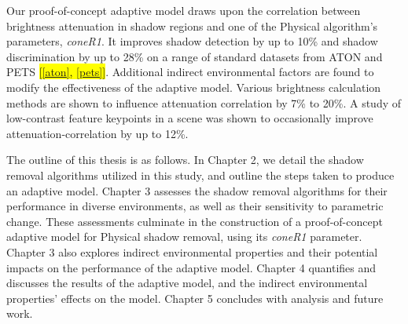 Our proof-of-concept adaptive model draws upon the correlation between brightness attenuation in shadow regions and one of the Physical algorithm's parameters, \textit{coneR1}. It improves shadow detection by up to 10\% and shadow discrimination by up to 28\% on a range of standard datasets from ATON and PETS \hl{[\ref{aton}, \ref{pets}]}. Additional indirect environmental factors are found to modify the effectiveness of the adaptive model. Various brightness calculation methods are shown to influence attenuation correlation by 7\% to 20\%.
A study of low-contrast feature keypoints in a scene was shown to occasionally improve attenuation-correlation by up to 12\%.

The outline of this thesis is as follows. In Chapter 2, we detail the shadow removal algorithms utilized in this study, and outline the steps taken to produce an adaptive model. Chapter 3 assesses the shadow removal algorithms for their performance in diverse environments, as well as their sensitivity to parametric change. These assessments culminate in the construction of a proof-of-concept adaptive model for Physical shadow removal, using its \textit{coneR1} parameter. Chapter 3 also explores indirect environmental properties and their potential impacts on the performance of the adaptive model. Chapter 4 quantifies and discusses the results of the adaptive model, and the indirect environmental properties' effects on the model. Chapter 5 concludes with analysis and future work. 


